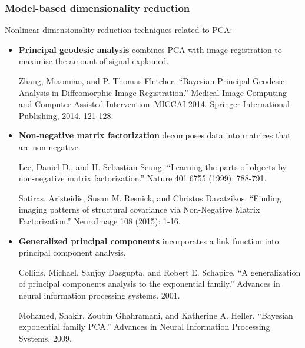 \begin{frame}
\frametitle{Model-based dimensionality reduction}
Nonlinear dimensionality reduction techniques related to PCA:
\begin{itemize}
\item {\bf Principal geodesic analysis} combines PCA with image registration to maximise the amount of signal explained.\par
\begin{tiny}
Zhang, Miaomiao, and P. Thomas Fletcher. ``Bayesian Principal Geodesic Analysis in Diffeomorphic Image Registration.'' Medical Image Computing and Computer-Assisted Intervention--MICCAI 2014. Springer International Publishing, 2014. 121-128.\par
\end{tiny}
\item {\bf Non-negative matrix factorization} decomposes data into matrices that are non-negative.\par
\begin{tiny}
Lee, Daniel D., and H. Sebastian Seung. ``Learning the parts of objects by non-negative matrix factorization.'' Nature 401.6755 (1999): 788-791.\par
Sotiras, Aristeidis, Susan M. Resnick, and Christos Davatzikos. ``Finding imaging patterns of structural covariance via Non-Negative Matrix Factorization.'' NeuroImage 108 (2015): 1-16.\par
\end{tiny}
\item {\bf Generalized principal components} incorporates a link function into principal component analysis.\par
\begin{tiny}
Collins, Michael, Sanjoy Dasgupta, and Robert E. Schapire. ``A generalization of principal components analysis to the exponential family.'' Advances in neural information processing systems. 2001.\par
Mohamed, Shakir, Zoubin Ghahramani, and Katherine A. Heller. ``Bayesian exponential family PCA.'' Advances in Neural Information Processing Systems. 2009.\par
\end{tiny}
\end{itemize}
\end{frame}

